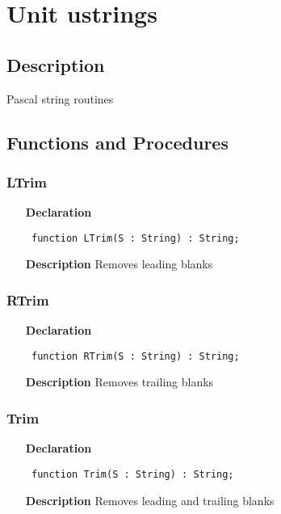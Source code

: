 \documentclass[12pt,a4paper,oneside]{report}
\newcommand{\declarationitem}[1]{\textbf{#1}}
\newcommand{\descriptiontitle}[1]{\textbf{#1}}
\newcommand{\code}[1]{\texttt{#1}}
\begin{document}
\section{Unit ustrings}
\label{ustrings}
\subsection{Description}
Pascal string routines 
\subsection{Functions and Procedures}
\subsubsection{LTrim}
\label{ustrings-LTrim}
\begin{itemize}\item[\declarationitem{Declaration}\hfill]
	\begin{flushleft}
		\code{
			function LTrim(S : String) : String;}
		
	\end{flushleft}
	
	\par
	\item[\descriptiontitle{Description}]
	Removes leading blanks
	
\end{itemize}
\subsubsection{RTrim}
\label{ustrings-RTrim}
\begin{itemize}\item[\declarationitem{Declaration}\hfill]
	\begin{flushleft}
		\code{
			function RTrim(S : String) : String;}
		
	\end{flushleft}
	
	\par
	\item[\descriptiontitle{Description}]
	Removes trailing blanks
	
\end{itemize}
\subsubsection{Trim}
\label{ustrings-Trim}
\begin{itemize}\item[\declarationitem{Declaration}\hfill]
	\begin{flushleft}
		\code{
			function Trim(S : String) : String;}
		
	\end{flushleft}
	
	\par
	\item[\descriptiontitle{Description}]
	Removes leading and trailing blanks
	
\end{itemize}
\end{document}
